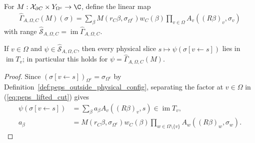 \begin{definition}%
    \label{def:peps_lifted_cut}
    \leanok
    For $M:\mathcal X_{\partial C}\times Y_{\Omega^c}\to\C$, define the linear map
    \begin{align}
        \widehat\Gamma_{A,\Omega,C}(M)(\sigma)
        =\sum_\beta M(r_C\beta,\sigma_{\Omega^c})w_C(\beta)
        \prod_{v\in\Omega}A_v((R\beta)_v,\sigma_v)
        \label{eq:peps_lifted_cut}
    \end{align}
    with range $\widehat{\mathcal S}_{A,\Omega,C}=\operatorname{im}\widehat\Gamma_{A,\Omega,C}$.
\end{definition}

\begin{lemma}%
    \label{thm:peps_lifted_cut_local_slice}
    \leanok
    If $v\in\Omega$ and $\psi\in\widehat{\mathcal S}_{A,\Omega,C}$, then every
    physical slice $s\mapsto\psi(\sigma[v\leftarrow s])$ lies in
    $\operatorname{im}T_v$; in particular this holds for
    $\psi=\widehat\Gamma_{A,\Omega,C}(M)$.
\end{lemma}
\begin{proof}\leanok
    Since $(\sigma[v\leftarrow s])_{\Omega^c}=\sigma_{\Omega^c}$ by
    Definition~\ref{def:peps_outside_physical_config}, separating the factor at
    $v\in\Omega$ in (\ref{eq:peps_lifted_cut}) gives
    \begin{align}
        \psi(\sigma[v\leftarrow s])
         & =\sum_\beta a_\beta A_v((R\beta)_v,s)\in\operatorname{im}T_v,
        \label{eq:peps_lifted_local_slice}                               \\
        a_\beta
         & =M(r_C\beta,\sigma_{\Omega^c})w_C(\beta)
        \prod_{w\in\Omega\setminus\{v\}}
        A_w((R\beta)_w,\sigma_w).
        \nonumber
    \end{align}
\end{proof}

